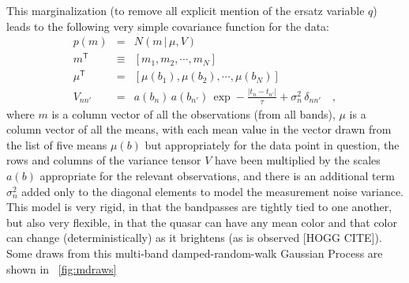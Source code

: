 \documentclass[letterpaper,12pt,preprint]{aastex}
\newcommand{\given}{\,|\,}
\newcommand{\transpose}[1]{{#1}^{\mathsf{T}}}
\begin{document}
This marginalization (to remove all explicit mention of the ersatz
variable $q$) leads to the following very simple covariance function
for the data:
\begin{eqnarray}
p(m) &=& N(m\given \mu,V)
\label{eq:likestart}
\\
\transpose{m} &\equiv& [m_1, m_2, \cdots , m_N]
\\
\transpose{\mu} &=& [\mu(b_1), \mu(b_2), \cdots , \mu(b_N)]
\\
V_{nn'} &=& a(b_n)\,a(b_{n'})\,\exp -\frac{|t_n - t_{n'}|}{\tau} + \sigma_n^2\,\delta_{nn'}
\label{eq:likeend}
\quad ,
\end{eqnarray}
where $m$ is a column vector of all the observations (from all bands),
$\mu$ is a column vector of all the means, with each mean value in the
vector drawn from the list of five means $\mu(b)$ but appropriately
for the data point in question, the rows and columns of the variance
tensor $V$ have been multiplied by the scales $a(b)$ appropriate for
the relevant observations, and there is an additional term
$\sigma_n^2$ added only to the diagonal elements to model the
measurement noise variance.  This model is very rigid, in that the
bandpasses are tightly tied to one another, but also very flexible, in
that the quasar can have any mean color and that color can change
(deterministically) as it brightens (as is observed [HOGG CITE]).
Some draws from this multi-band damped-random-walk Gaussian Process
are shown in \figurename~\ref{fig:mdraws}
\end{document}
